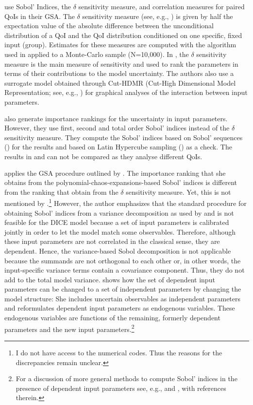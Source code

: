\documentclass[a4paper,12pt]{article}
\begin{document}
\cite{Anderson.2014} use Sobol' Indices, the $\delta$ sensitivity measure, and correlation measures for paired QoIs in their GSA. The $\delta$ sensitivity measure (see, e.g., \cite{Borgonovo.2006}) is given by half the expectation value of the absolute difference between the unconditional distribution of a QoI and the QoI distribution conditioned on one specific, fixed input (group). Estimates for these measures are computed with the algorithm used in \cite{Plischke.2013} applied to a Monte-Carlo sample (N=10,000). In \cite{Anderson.2014}, the $\delta$ sensitivity measure is the main measure of sensitivity and used to rank the parameters in terms of their contributions to the model uncertainty. The authors also use a surrogate model obtained through Cut-HDMR (Cut-High Dimensional Model Representation; see, e.g., \cite{Ziehn.2009}) for graphical analyses of the interaction between input parameters.

\cite{Butler.2014} also generate importance rankings for the uncertainty in input parameters. However, they use first, second and total order Sobol' indices instead of the $\delta$ sensitivity measure. They compute the Sobol' indices based on Sobol' sequences (\cite{Sobol.1967}) for the results and based on Latin Hypercube sampling (\cite{McKay.1979}) as a check. The results in \cite{Butler.2014} and \cite{Anderson.2014} can not be compared as they analyse different QoIs.

\cite{Miftakhova.2018} applies the GSA procedure outlined by \cite{Harenberg.2019}. The importance ranking that she obtains from the polynomial-chaos-expansions-based Sobol' indices is different from the ranking that \cite{Anderson.2014} obtain from the $\delta$ sensitivity measure. Yet, this is not mentioned by \citeauthor{Miftakhova.2018}.\footnote{I do not have access to the numerical codes. Thus the reasons for the discrepancies remain unclear.} However, the author emphasizes that the standard procedure for obtaining Sobol' indices from a variance decomposition as used by \cite{Anderson.2014} and \cite{Butler.2014} is not feasible for the DICE model because a set of input parameters is calibrated jointly in order to let the model match some observables. Therefore, although these input parameters are not correlated in the classical sense, they are dependent. Hence, the variance-based Sobol decomposition is not applicable because the summands are not orthogonal to each other or, in other words, the input-specific variance terms contain a covariance component. Thus, they do not add to the total model variance. \cite{Miftakhova.2018} shows how the set of dependent input parameters can be changed to a set of independent parameters by changing the model structure: She includes uncertain observables as independent parameters and reformulates dependent input parameters as endogenous variables. These endogenous variables are functions of the remaining, formerly dependent parameters and the new input parameters.\footnote{For a discussion of more general methods to compute Sobol' indices in the presence of dependent input parameters see, e.g., \cite{Chastaing.2015} and \cite{Wiederkehr.2018}, with references therein.}
\end{document}
